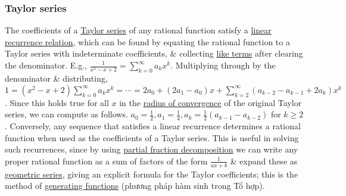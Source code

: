 \documentclass{article}
\begin{document}
\subsubsection{Taylor series}
The coefficients of a \href{https://en.wikipedia.org/wiki/Taylor_series}{Taylor series} of any rational function satisfy a \href{https://en.wikipedia.org/wiki/Recurrence_relation}{linear recurrence relation}, which can be found by equating the rational function to a Taylor series with indeterminate coefficients, \& collecting \href{https://en.wikipedia.org/wiki/Like_terms}{like terms} after clearing the denominator. E.g., $\frac{1}{x^2 - x + 2} = \sum_{k=0}^\infty a_kx^k$. Multiplying through by the denominator \& distributing, $1 = (x^2 - x + 2)\sum_{k=0}^\infty a_kx^k = \cdots = 2a_0 + (2a_1 - a_0)x + \sum_{k=2}^\infty (a_{k-2} - a_{k-1} + 2a_k)x^k$. Since this holds true for all $x$ in the \href{https://en.wikipedia.org/wiki/Radius_of_convergence}{radius of convergence} of the original Taylor series, we can compute as follows. $a_0 = \frac{1}{2},a_1 = \frac{1}{4},a_k = \frac{1}{2}(a_{k-1} - a_{k-2})$ for $k\ge2$. Conversely, any sequence that satisfies a linear recurrence determines a rational function when used as the coefficients of a Taylor series. This is useful in solving such recurrences, since by using \href{https://en.wikipedia.org/wiki/Partial_fraction}{partial fraction decomposition} we can write any proper rational function as a sum of factors of the form $\frac{1}{ax + b}$ \& expand these as \href{https://en.wikipedia.org/wiki/Geometric_series}{geometric series}, giving an explicit formula for the Taylor coefficients; this is the method of \href{https://en.wikipedia.org/wiki/Generating_functions}{generating functions} (phương pháp hàm sinh trong Tổ hợp).
\end{document}
